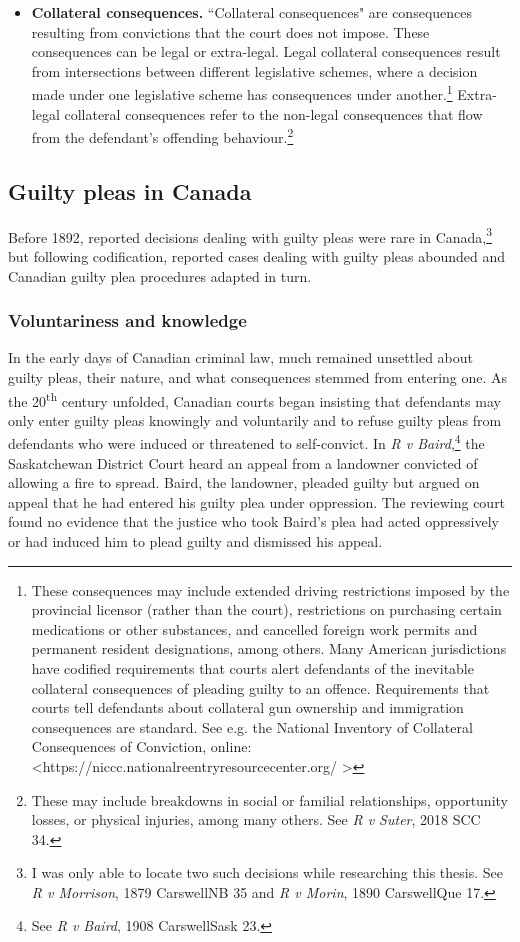 \begin{itemize}
\item \textbf{Collateral consequences.} ``Collateral consequences" are consequences resulting from convictions that the court does not impose. These consequences can be legal or extra-legal. Legal collateral consequences result from intersections between different legislative schemes, where a decision made under one legislative scheme has consequences under another.\footnote{These consequences may include extended driving restrictions imposed by the provincial licensor (rather than the court), restrictions on purchasing certain medications or other substances, and cancelled foreign work permits and permanent resident designations, among others. Many American jurisdictions have codified requirements that courts alert defendants of the inevitable collateral consequences of pleading guilty to an offence. Requirements that courts tell defendants about collateral gun ownership and immigration consequences are standard. See e.g. the National Inventory of Collateral Consequences of Conviction, online: \textless https://niccc.nationalreentryresourcecenter.org/ \textgreater} Extra-legal collateral consequences refer to the non-legal consequences that flow from the defendant's offending behaviour.\footnote{These may include breakdowns in social or familial relationships, opportunity losses, or physical injuries, among many others. See \textit{R v Suter}, 2018 SCC 34.}
\end{itemize}

\subsection{Guilty pleas in Canada}

Before 1892, reported decisions dealing with guilty pleas were rare in Canada,\footnote{I was only able to locate two such decisions while researching this thesis. See \textit{R v Morrison}, 1879 CarswellNB 35 and \textit{R v Morin}, 1890 CarswellQue 17.} but following codification, reported cases dealing with guilty pleas abounded and Canadian guilty plea procedures adapted in turn.

\subsubsection{Voluntariness and knowledge}

In the early days of Canadian criminal law, much remained unsettled about guilty pleas, their nature, and what consequences stemmed from entering one. As the 20\textsuperscript{th} century unfolded, Canadian courts began insisting that defendants may only enter guilty pleas knowingly and voluntarily and to refuse guilty pleas from defendants who were induced or threatened to self-convict. In \textit{R v Baird},\footnote{See \textit{R v Baird}, 1908 CarswellSask 23.} the Saskatchewan District Court heard an appeal from a landowner convicted of allowing a fire to spread. Baird, the landowner, pleaded guilty but argued on appeal that he had entered his guilty plea under oppression. The reviewing court found no evidence that the justice who took Baird's plea had acted oppressively or had induced him to plead guilty and dismissed his appeal. 

